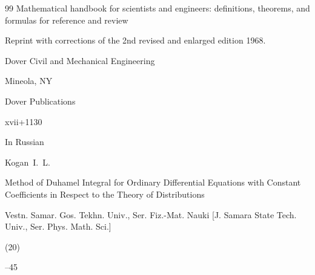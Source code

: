 \begin{thebibliography}{99}
\book Mathematical handbook for scientists and engineers: definitions, theorems, and formulas for reference and review

\bookinfo Reprint with corrections of the 2nd revised and enlarged edition 1968. 

\serial Dover Civil and Mechanical Engineering

\publaddr Mineola, NY

\publ Dover Publications 

\totalpages xvii+1130 






\lang In Russian

\by Kogan~I.~L.

\paper Method of Duhamel Integral for Ordinary Differential Equations with Constant Coefficients in Respect to the Theory of Distributions

\jour Vestn. Samar. Gos. Tekhn. Univ., Ser. Fiz.-Mat. Nauki \rm [J. Samara State Tech. Univ., Ser. Phys. Math. Sci.]


(20)

--45







\end{thebibliography}





\renewcommand{\baselinestretch}{0.9}



\newpage



%

